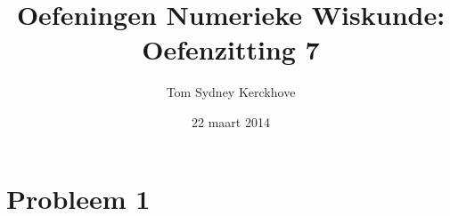 \documentclass[12pt,a4paper]{article}
\author{Tom Sydney Kerckhove}
\title{Oefeningen Numerieke Wiskunde:\\ Oefenzitting 7}
\date{22 maart 2014}
\begin{document}
\maketitle

\section{Probleem 1}
\end{document}
